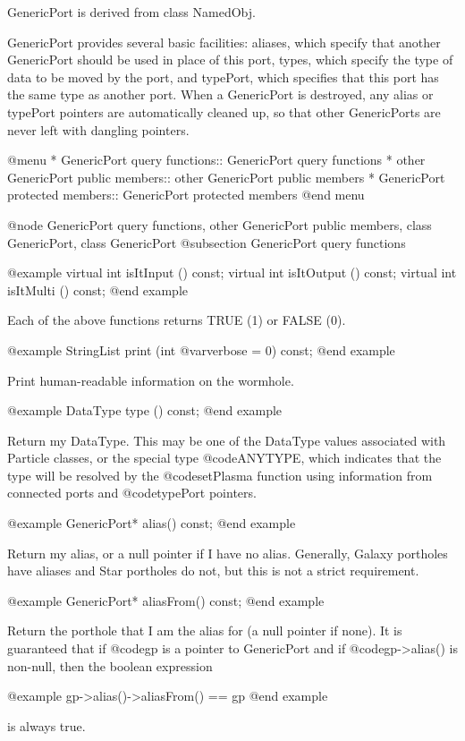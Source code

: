 GenericPort is derived from class NamedObj.

GenericPort provides several basic facilities: aliases, which specify
that another GenericPort should be used in place of this port, types,
which specify the type of data to be moved by the port, and typePort,
which specifies that this port has the same type as another port.
When a GenericPort is destroyed, any alias or typePort pointers are
automatically cleaned up, so that other GenericPorts are never left
with dangling pointers.

@menu
* GenericPort query functions::  GenericPort query functions
* other GenericPort public members::  other GenericPort public members
* GenericPort protected members::  GenericPort protected members
@end menu

@node GenericPort query functions, other GenericPort public members, class GenericPort, class GenericPort
@subsection GenericPort query functions

@example
virtual int isItInput () const;
virtual int isItOutput () const;
virtual int isItMulti () const;
@end example

Each of the above functions returns TRUE (1) or FALSE (0).

@example
StringList print (int @var{verbose} = 0) const;
@end example

Print human-readable information on the wormhole.

@example
DataType type () const;
@end example

Return my DataType.  This may be one of the DataType values associated
with Particle classes, or the special type @code{ANYTYPE}, which
indicates that the type will be resolved by the @code{setPlasma}
function using information from connected ports and @code{typePort} pointers.

@example
GenericPort* alias() const;
@end example

Return my alias, or a null pointer if I have no alias.  Generally,
Galaxy portholes have aliases and Star portholes do not, but this
is not a strict requirement.

@example
GenericPort* aliasFrom() const;
@end example

Return the porthole that I am the alias for (a null pointer if none).
It is guaranteed that if @code{gp} is a pointer to GenericPort and if
@code{gp->alias()} is non-null, then the boolean expression

@example
gp->alias()->aliasFrom() == gp
@end example

is always true.

